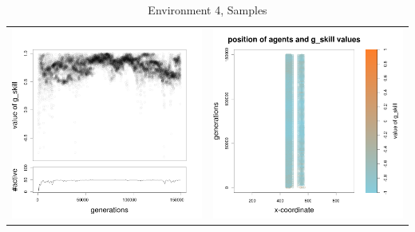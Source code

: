 \documentclass[a4paper,10pt]{article}
\begin{document}
\begin{table}[h!]
\caption{Environment 4, Samples}
 \centering
 \begin{tabular}{cc}
 \includegraphics[width=\imgSize]{images/5StaticEnv/Gplot17_staticEnv4}&\includegraphics[width=\imgSize]{images/5StaticEnv/Gplot17Static_staticEnv4}\\

\end{tabular}
\end{table}
\end{document}
